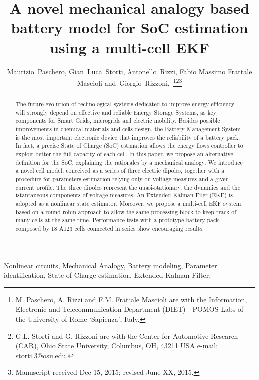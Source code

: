 \documentclass[journal]{IEEEtran}
\begin{document}
\title{A novel mechanical analogy based battery model for SoC estimation using a multi-cell EKF}
\author{Maurizio~Paschero,
        Gian~Luca~Storti,
        Antonello~Rizzi,
        Fabio Massimo Frattale Mascioli
        and~Giorgio~Rizzoni,~\thanks{M. Paschero, A. Rizzi and F.M. Frattale Mascioli are with the Information, Electronic and Telecommunication Department (DIET) - POMOS Labs of the University of Rome `Sapienza', Italy.}\thanks{G.L. Storti and G. Rizzoni are with the Center for Automotive Research (CAR), Ohio State University, Columbus, OH, 43211 USA e-mail: storti.3@osu.edu.}\thanks{Manuscript received Dec 15, 2015; revised June XX, 2015.}
}
\maketitle
\begin{abstract}
The future evolution of technological systems dedicated to improve energy efficiency will strongly depend on effective and reliable Energy Storage Systems, as key components for Smart Grids, microgrids and electric mobility. 
Besides possible improvements in chemical materials and cells design, the Battery Management System is the most important electronic device that improves the reliability of a battery pack. In fact, a precise State of Charge (SoC) estimation allows the energy flows controller to exploit better the full capacity of each cell. In this paper, we propose an alternative definition for the SoC, explaining the rationales by a mechanical analogy. We introduce a novel cell model, conceived as a series of three electric dipoles, together with a procedure for parameters estimation relying only on voltage measures and a given current profile. The three dipoles represent the quasi-stationary, the dynamics and the istantaneous components of voltage measures. An Extended Kalman Filer (EKF) is adopted as a nonlinear state estimator. Moreover, we propose a multi-cell EKF system based on a round-robin approach to allow the same processing block to keep track of many cells at the same time. Performance tests with a prototype battery pack composed by 18 A123 cells connected in series show encouraging results.
\end{abstract}
\begin{IEEEkeywords}
Nonlinear circuits, Mechanical Analogy, Battery modeling, Parameter identification, State of Charge estimation, Extended Kalman Filter.
\end{IEEEkeywords}
\end{document}
